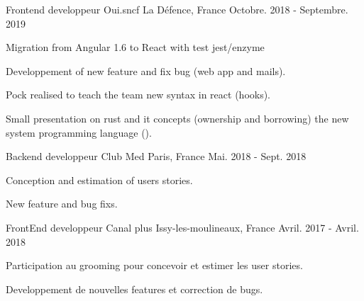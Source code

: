 

\begin{cventries}

  \cventry
    {Frontend developpeur} %
    {Oui.sncf} %
    {La Défence, France} %
    {Octobre. 2018 - Septembre. 2019} %
    {
      \begin{cvitems} %
        \item {Migration from  Angular 1.6 to React with test jest/enzyme}
        \item {Developpement of new feature and fix  bug (web app and mails).}
        \item {Pock realised to teach the team new syntax in react (hooks).}
        \item {Small presentation on rust and it concepts (ownership and borrowing) the new system programming language ().}
      \end{cvitems}
    }
\cventry
  {Backend developpeur} %
  {Club Med} %
  {Paris, France} %
  {Mai. 2018 - Sept. 2018} %
  {
    \begin{cvitems} %
      \item {Conception and estimation of users stories.}
      \item {New feature and bug fixs.}
    \end{cvitems}
  }

  \cventry
    {FrontEnd developpeur} %
    {Canal plus} %
    {Issy-les-moulineaux, France} %
    {Avril. 2017 - Avril. 2018} %
    {
      \begin{cvitems} %
        \item {Participation au grooming pour concevoir et estimer les user stories.}
        \item {Developpement de nouvelles features et correction de bugs.}
      \end{cvitems}
    }


\end{cventries}
